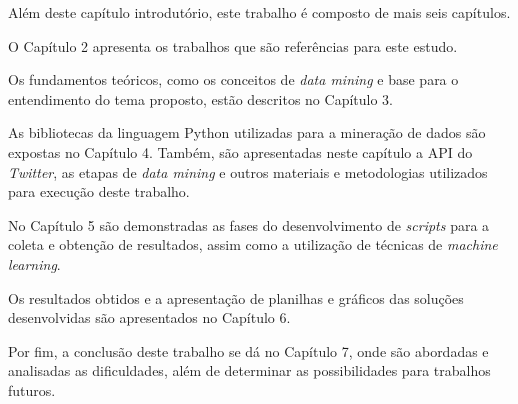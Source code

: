 Além deste capítulo introdutório, este trabalho é composto de mais seis capítulos.

O Capítulo 2 apresenta os trabalhos que são referências para este estudo.

Os fundamentos teóricos, como os conceitos de \textit{data mining} e base para o entendimento do tema proposto, estão descritos no Capítulo 3.

As bibliotecas da linguagem Python utilizadas para a mineração de dados são expostas no Capítulo 4. Também, são apresentadas neste capítulo a API do \textit{Twitter}, as etapas de \textit{data mining} e outros materiais e metodologias utilizados para execução deste trabalho.

No Capítulo 5 são demonstradas as fases do desenvolvimento de \textit{scripts} para a coleta e obtenção de resultados, assim como a utilização de técnicas de \textit{machine learning}.

Os resultados obtidos e a apresentação de planilhas e gráficos das soluções desenvolvidas são apresentados no Capítulo 6.

Por fim, a conclusão deste trabalho se dá no Capítulo 7, onde são abordadas e analisadas as dificuldades, além de determinar as possibilidades para trabalhos futuros.
